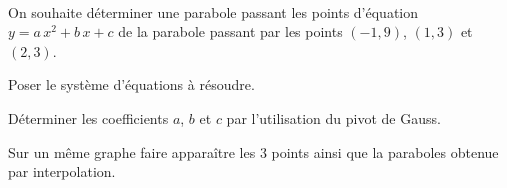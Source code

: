 \exer{[polynome]}
\setcounter{numques}{0}~\\




On souhaite déterminer une parabole passant les points d'équation $y=a\,x^2+b\,x+c$ de la parabole passant par les points $(-1,9)$, $(1,3)$ et $(2,3)$.

\question{} Poser le système d'équations à résoudre.

\question{} Déterminer les coefficients $a$, $b$ et $c$ par l'utilisation du pivot de Gauss.

\question{} Sur un même graphe faire apparaître les 3 points ainsi que la paraboles obtenue par interpolation.